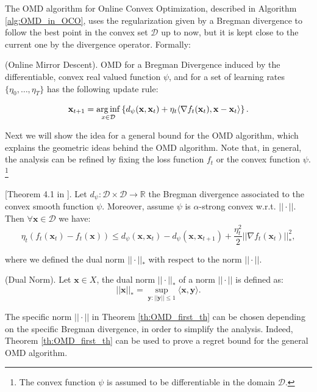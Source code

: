 The OMD algorithm for Online Convex Optimization, described in Algorithm \ref{alg:OMD_in_OCO}, uses the regularization given by a Bregman divergence to follow the best point in the convex set $\mathcal D$ up to now, but it is kept close to the current one by the divergence operator. Formally:

\begin{definition}(Online Mirror Descent). OMD for a Bregman Divergence induced by the differentiable, convex real valued function $\psi$, and for a set of learning rates $\{\eta_0,\ldots,\eta_T\}$ has the following update rule: 

\begin{equation}\label{eq:OMD_update}
\mathbf x_{t+1} =\operatorname*{arg\,inf}\limits_{x\in\mathcal D} \left\{d_\psi(\mathbf x,\mathbf x_t)+\eta_t\langle\nabla f_t(\mathbf x_t),\mathbf x-\mathbf x_t\rangle\right\}.
\end{equation}
\end{definition}

Next we will show the idea for a general bound for the OMD algorithm, which explains the geometric ideas behind the OMD algorithm. Note that, in general, the analysis can be refined by fixing the loss function $f_t$ or the convex function $\psi$. \footnote{The convex function $\psi$ is assumed to be differentiable in the domain $\mathcal D$.}

\begin{lemma}\label{th:OMD_first_th}[Theorem 4.1 in \cite{beck2003mirror}].
Let $d_\psi:\mathcal D\times\mathcal D\to \mathbb R$ the Bregman divergence associated to the convex smooth function $\psi$. Moreover, assume $\psi$ is $\alpha$-strong convex w.r.t. $||\cdot||$.
Then $\forall \mathbf x\in\mathcal D$ we have: 
$$\eta_t (f_t(\mathbf x_t)-f_t(\mathbf x))\le d_\psi(\mathbf x,\mathbf x_t)-d_\psi(\mathbf x,\mathbf x_{t+1})+\frac{\eta_t^2}{2}||\nabla f_t(\mathbf x_t)||_*^2,$$ 
\end{lemma}

where we defined the dual norm $||\cdot||_*$ with respect to the norm $||\cdot||$.

\begin{definition}(Dual Norm).
Let $\mathbf x\in X$, the dual norm $||\cdot||_*$ of a norm $||\cdot||$ is defined as:
$$||\mathbf x||_*=\sup\limits_{\mathbf y:||\mathbf y||\le1}\langle \mathbf x,\mathbf y\rangle.$$
\end{definition}

The specific norm $||\cdot||$ in  Theorem \ref{th:OMD_first_th} can be chosen depending on the specific Bregman divergence, in order to simplify the analysis. Indeed, Theorem \ref{th:OMD_first_th} can be used to prove a regret bound for the general OMD algorithm. 


